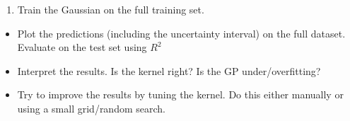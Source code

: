 \documentclass[11pt]{article}
\providecommand{\tightlist}{%
      \setlength{\itemsep}{0pt}\setlength{\parskip}{0pt}}
\begin{document}
\begin{enumerate}
\def\labelenumi{\arabic{enumi}.}
\setcounter{enumi}{1}
\tightlist
\item
  Train the Gaussian on the full training set.
\end{enumerate}

\begin{itemize}
\tightlist
\item
  Plot the predictions (including the uncertainty interval) on the full
  dataset. Evaluate on the test set using \(R^2\)
\item
  Interpret the results. Is the kernel right? Is the GP
  under/overfitting?
\item
  Try to improve the results by tuning the kernel. Do this either
  manually or using a small grid/random search.
\end{itemize}
\end{document}

